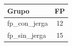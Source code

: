 \begin{tabular}{lc}
\toprule
Grupo & FP \\
\midrule
fp\_con\_jerga & 12 \\
fp\_sin\_jerga & 15 \\
\bottomrule
\end{tabular}
